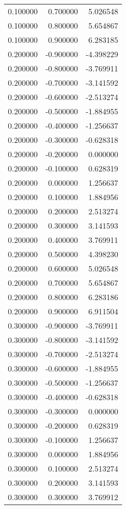 \begin{tabular}{rrr}
0.100000 & 0.700000 & 5.026548 \\
0.100000 & 0.800000 & 5.654867 \\
0.100000 & 0.900000 & 6.283185 \\
0.200000 & -0.900000 & -4.398229 \\
0.200000 & -0.800000 & -3.769911 \\
0.200000 & -0.700000 & -3.141592 \\
0.200000 & -0.600000 & -2.513274 \\
0.200000 & -0.500000 & -1.884955 \\
0.200000 & -0.400000 & -1.256637 \\
0.200000 & -0.300000 & -0.628318 \\
0.200000 & -0.200000 & 0.000000 \\
0.200000 & -0.100000 & 0.628319 \\
0.200000 & 0.000000 & 1.256637 \\
0.200000 & 0.100000 & 1.884956 \\
0.200000 & 0.200000 & 2.513274 \\
0.200000 & 0.300000 & 3.141593 \\
0.200000 & 0.400000 & 3.769911 \\
0.200000 & 0.500000 & 4.398230 \\
0.200000 & 0.600000 & 5.026548 \\
0.200000 & 0.700000 & 5.654867 \\
0.200000 & 0.800000 & 6.283186 \\
0.200000 & 0.900000 & 6.911504 \\
0.300000 & -0.900000 & -3.769911 \\
0.300000 & -0.800000 & -3.141592 \\
0.300000 & -0.700000 & -2.513274 \\
0.300000 & -0.600000 & -1.884955 \\
0.300000 & -0.500000 & -1.256637 \\
0.300000 & -0.400000 & -0.628318 \\
0.300000 & -0.300000 & 0.000000 \\
0.300000 & -0.200000 & 0.628319 \\
0.300000 & -0.100000 & 1.256637 \\
0.300000 & 0.000000 & 1.884956 \\
0.300000 & 0.100000 & 2.513274 \\
0.300000 & 0.200000 & 3.141593 \\
0.300000 & 0.300000 & 3.769912 \\

\end{tabular}
